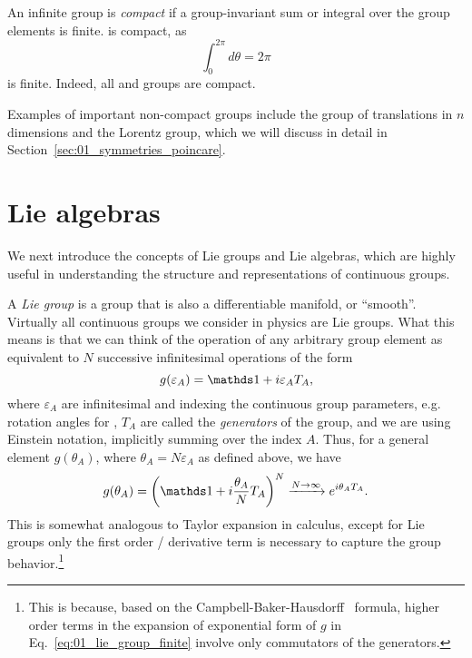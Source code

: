 \begin{definition}
\label{def:01_compact}
An infinite group is \textit{compact} if a group-invariant sum or integral over the group elements is finite.
\UU[1] is compact, as
\begin{equation}
	\label{eq:01_u1_integral}
	\int_0^{2\pi} d\theta = 2\pi
\end{equation}
is finite. 
Indeed, all \SO[n] and \SU[n] groups are compact.
\end{definition}

Examples of important non-compact groups include the group of translations in $n$ dimensions and the Lorentz group, which we will discuss in detail in Section~\ref{sec:01_symmetries_poincare}.

\section{Lie algebras}
\label{sec:01_symmetries_lie}

We next introduce the concepts of Lie groups and Lie algebras, which are highly useful in understanding the structure and representations of continuous groups.

\begin{definition}
\label{def:01_lie_group}
A \textit{Lie group} is a group that is also a differentiable manifold, or ``smooth''.
Virtually all continuous groups we consider in physics are Lie groups.
What this means is that we can think of the operation of any arbitrary group element as equivalent to $N$ successive infinitesimal operations of the form 
\begin{equation}
	\label{eq:01_lie_group_infinitesimal}
	g(\varepsilon_A) = \identity + i \varepsilon_A T_A,
\end{equation}
where $\varepsilon_A$ are infinitesimal and indexing the continuous group parameters, e.g. rotation angles for \SO[n], $T_A$ are called the \textit{generators} of the group,
and we are using Einstein notation, implicitly summing over the index $A$.
Thus, for a general element $g(\theta_A)$, where $\theta_A = N \varepsilon_A$ as defined above, we have
\begin{equation}
	\label{eq:01_lie_group_finite}
	g(\theta_A) = \left(\identity + i \frac{\theta_A}{N} T_A\right)^N \xrightarrow{N \rightarrow \infty} e^{i\theta_A T_A}.
\end{equation}
This is somewhat analogous to Taylor expansion in calculus, except for Lie groups only the first order / derivative term is necessary to capture the group behavior.\footnote{This is because, based on the Campbell-Baker-Hausdorff~\cite{enwiki:1183926638} formula, higher order terms in the expansion of exponential form of $g$ in Eq.~\ref{eq:01_lie_group_finite} involve only commutators of the generators.}
\end{definition}

